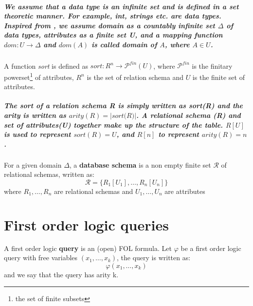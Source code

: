 \subparagraph*{\textnormal{We assume that a \textit{data type} is an infinite set and is defined in a set theoretic manner. For example, \textit{int}, \textit{strings} etc. are \textit{data types}. Inspired from \cite{DBLP:books/aw/found_DB}, we assume \textit{domain} as a countably infinite set $\Delta$ of data types, \textit{attributes} as a finite set \textit{U}, and a mapping function $dom:U\rightarrow\Delta$ and $dom(A)$ is called domain of $A$, where $A \in U$.}}

\begin{defs}
	\label{defs:preliminaries_dbn_sort_function}
	A function \textit{sort} is defined as $sort:R^{n}\rightarrow{\mathcal{P}^{fin}}(U)$, where ${\mathcal{P}^{fin}}$ is the finitary powerset\footnote{the set of finite subsets} of attributes, $R^{n}$ is the set of relation schema and $U$ is the finite set of attributes.
\end{defs}

\subparagraph*{\textnormal{The sort of a relation schema \textit{R} is simply written as \textit{sort(R)} and the arity is written as $arity(R) = |\textit{sort(R)}|$. A relational schema (\textit{R}) and set of attributes(\textit{U}) together make up the structure of the table. $R[U]$ is used to represent $sort(R) = U$, and $R[n]$ to represent $arity(R) = n$.}}

\begin{defs}
	\label{defs:preliminaries_dbn_database_schema}
	For a given domain $\Delta$, a \textbf{database schema} is a non empty finite set $\mathcal{R}$ of relational schemas, written as:
	\begin{equation*}
	\mathcal{R} = \{R_{1}[U_{1}],\ldots,R_{n}[U_{n}]\}
	\end{equation*}
	where $R_{1},\ldots,R_{n}$ are relational schemas and $U_{1},\ldots,U_{n}$ are attributes
\end{defs}

\section{First order logic queries}
\begin{defs}
	A first order logic \textbf{query} is an (open) FOL formula. Let $\varphi$ be a first order logic query with free variables $(x_{1},\ldots,x_{k})$, the query is written as:
	\begin{equation*}
	\varphi (x_{1},\ldots,x_{k})
	\end{equation*}
	and we say that the query has arity k.
\end{defs}
